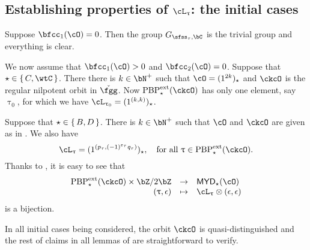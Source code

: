 \documentclass[12pt,a4paper]{amsart}
\def\MYD{{\mathsf{MYD}}}
\numberwithin{equation}{section}
\theoremstyle{remark}
\def\PBPes{\mathrm{PBP}^{\mathrm{ext}}_{\star}}
\begin{document}
\subsection{Establishing properties of $\ac_{\uptau}$: the initial cases}
\label{sec:init}
Suppose $\bfcc_{1}(\cO)=0$.
Then the group $G_{\sfss_\tau,\bC}$ is the trivial group and everything is clear.

\smallskip

We now assume that $\bfcc_{1}(\cO)>0$ and $\bfcc_{2}(\cO)=0$. Suppose that
$\star \in \set{C,\wtC}$.
There there is $k\in\bN^{+}$ such that $\cO =
(1^{2k})_{\star}$ and $\ckcO$ is the regular nilpotent orbit in $\ckfgg$.
Now $\PBPes(\ckcO)$ has only one element, say $\uptau_{0}$, for which
we have $\ac_{\uptau_{0}} = (1^{(k,k)})_{\star}$.

\smallskip

Suppose that $\star \in \set{B,D}$.
There is $k\in \bN^{+}$ such that
$\cO$ and $\ckcO$ are given as in .
We also have
\[
  \ac_{\uptau} = (1^{(p_{\tau},(-1)^{\varepsilon_{\tau}}q_{\tau})})_{\star},
  \quad  \Forall \uptau\in \PBPes(\ckcO).
\]
Thanks to , it is easy to see that
\[
  \begin{array}{rcl}
    \PBPes(\ckcO)\times \bZ/2\bZ & \rightarrow & \MYD_{\star}(\cO)\\
    (\uptau,\epsilon) & \mapsto & \ac_{\uptau}\otimes (\epsilon,\epsilon)
  \end{array}
\]
is a bijection.



\smallskip

In all initial cases being considered, the orbit $\ckcO$ is quasi-distinguished and the rest of claims in all lemmas
of  are straightforward to verify.
\end{document}
